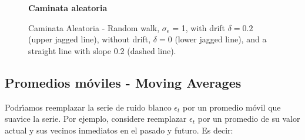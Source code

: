 \begin{figure}[h]
	\centering
	\textbf{Caminata aleatoria}\par\medskip
	\caption{Caminata Aleatoria - Random walk, $\sigma_\epsilon$ = 1, with drift $\delta =0 .2$ (upper jagged line), without drift, $\delta = 0$ (lower jagged line), and a straight line with slope 0.2 (dashed line).}\label{figura7}
\end{figure}

\pagebreak\subsection{Promedios m\'oviles - Moving Averages}
Podr\'\i{}amos reemplazar la serie de ruido blanco $\epsilon_t$ por un promedio m\'ovil que suavice la serie. Por ejemplo, considere reemplazar $\epsilon_t$ por un promedio de su valor actual y sus vecinos inmediatos en el pasado y futuro. Es decir:

